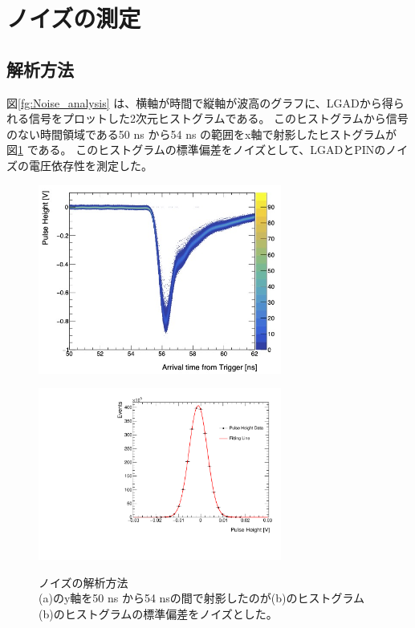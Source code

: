\section{ノイズの測定}
\subsection{解析方法}
図\ref{fg:Noise_analysis} は、横軸が時間で縦軸が波高のグラフに、LGADから得られる信号をプロットした2次元ヒストグラムである。
このヒストグラムから信号のない時間領域である50 ns から54 ns の範囲をx軸で射影したヒストグラムが 図\ref{fg:Noise_hist} である。
このヒストグラムの標準偏差をノイズとして、LGADとPINのノイズの電圧依存性を測定した。

\begin{figure}[h]
    \begin{minipage}[b]{0.5\linewidth}
        \centering
        \includegraphics[width=8cm]{fig/ch5/noisevstime.jpg}
        \label{fg:Noise_analysis}
    \end{minipage}
    \begin{minipage}[b]{0.5\linewidth}
        \centering
        \includegraphics[width=8cm]{fig/graph/noise_hist.pdf}
        \label{fg:Noise_hist}
    \end{minipage}
    \caption[ノイズの解析方法]{ノイズの解析方法\\(a)のy軸を50 ns から54 nsの間で射影したのが(b)のヒストグラム\\(b)のヒストグラムの標準偏差をノイズとした。}
\end{figure}

